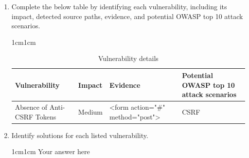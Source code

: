 \documentclass[11pt,letterpaper]{article}
\newenvironment{answer}{\em \color{blue} \begin{adjustwidth}{1cm}{1cm}}{\end{adjustwidth}}
\begin{document}
\begin{enumerate}
		\item Complete the below table by identifying each vulnerability, including its impact, detected source paths, evidence, and potential OWASP top 10 attack scenarios.
		
		\begin{answer}
			\begin{table}[h!]
				\caption{Vulnerability details} \label{tab:Vulnerability details}
				\begin{tabularx}{\columnwidth}{|p{3.7cm}|p{1.5cm}|X|p{4.2cm}|}
					\hline
					\textbf{Vulnerability} &  \textbf{Impact} & \textbf{Evidence} & \textbf{Potential OWASP top 10 attack scenarios}\\
					\hline
					Absence of Anti-CSRF Tokens & Medium & <form action="\#" method="post"> & CSRF\\\hline
				\end{tabularx}
			\end{table}
		\end{answer}
		
		\item Identify solutions for each listed vulnerability.
		
		\begin{answer}
			Your answer here
		\end{answer}
		
	\end{enumerate}
	
\end{document}
